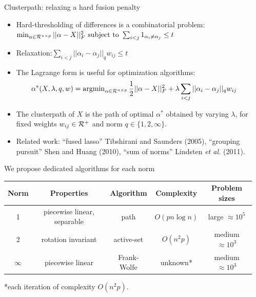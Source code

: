 \documentclass[final]{beamer}
\begin{document}
\begin{frame}{}
\begin{columns}[T]
\begin{column}{0.315\paperwidth}
\begin{block}{Clusterpath: relaxing a hard fusion penalty}
\begin{itemize}
\item Hard-thresholding of differences is a combinatorial problem:
$
 \min_{    \alpha\in{\mathcal R}^{n\times p}}       ||\alpha-X||_F^2 \text{  subject to  }
\sum_{i<j}1_{\alpha_i\neq\alpha_j} \leq t$
\item \alert{Relaxation:$\sum_{i<j}||\alpha_i-\alpha_j||_q w_{ij}\leq t$}
\item The Lagrange form is useful for optimization algorithms:
$$
\alpha^*(X,\lambda,q,w)=\operatorname{argmin}_{\alpha\in{\mathcal R}^{n\times p}}
\frac 1 2||\alpha-X||_F^2+\lambda\sum_{i<j}||\alpha_i-\alpha_j||_q w_{ij}
$$ 
\item The \alert<1>{clusterpath} of $X$ is the path of optimal
  $\alpha^*$ obtained by varying $\lambda$, for fixed weights
  $w_{ij}\in{\mathcal R}^+$ and norm $q\in\{1,2,\infty\}$.
\item 
 Related work: ``fused lasso'' Tibshirani and Saunders (2005),
``grouping pursuit'' Shen and Huang (2010), ``sum of norms'' Lindsten
\emph{et al.}  (2011).
\end{itemize} 
\end{block}

 
\vspace{-1in}
\begin{block}{We propose dedicated algorithms for each norm}
{\small
\begin{center}
\begin{tabular}{ccccc}
\hline
Norm & Properties & Algorithm &Complexity & Problem sizes \\
\hline
1 &piecewise linear, separable&path&$O(pn\log n)$&large $\approx 10^5$  \\
2 &rotation invariant&active-set& $O(n^2p)$&medium $\approx10^3$ \\
$\infty$ & piecewise linear&Frank-Wolfe&unknown*&medium $\approx 10^3$\\
\hline
\end{tabular}
\end{center}
*each iteration of complexity $O(n^2p)$.
}
\end{block}

\end{column}\hfill

\begin{column}{0.315\linewidth}


\end{column}
\end{columns}
\end{frame}
\end{document}
